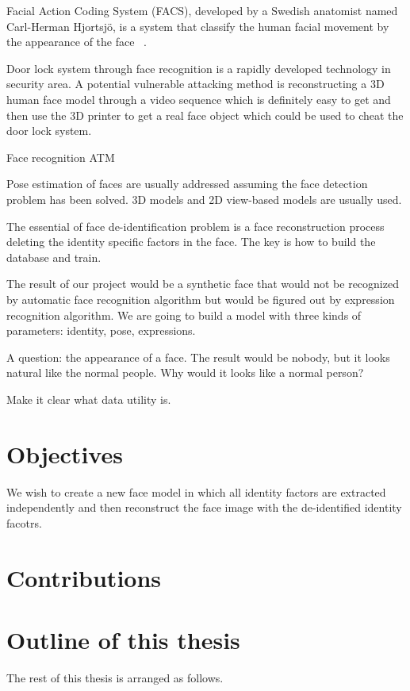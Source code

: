 Facial Action Coding System (FACS), developed by a Swedish anatomist named Carl-Herman Hjortsjö, is a system that classify the human facial movement by the appearance of the face ~\cite{facs70}. 


\par
Door lock system through face recognition is a rapidly developed technology in security area. A potential vulnerable attacking method is reconstructing a 3D human face model through a video sequence which is definitely easy to get and then use the 3D printer to get a real face object which could be used to cheat the door lock system. 

Face recognition ATM



Pose estimation of faces are usually addressed assuming the face detection problem has been solved. 3D models and 2D view-based models are usually used. 


The essential of face de-identification problem is a face reconstruction process deleting the identity specific factors in the face.  
The key is how to build the database and train. 

The result of our project would be a synthetic face that would not be recognized by automatic face recognition algorithm but would be figured out by expression recognition algorithm. We are going to build a model with three kinds of parameters: identity, pose, expressions. 

A question: the appearance of a face. The result would be nobody, but it looks natural like the normal people. Why would it looks like a normal person?

Make it clear what data utility is. 

\section{Objectives}
We wish to create a new face model in which all identity factors are extracted independently and then reconstruct the face image with the de-identified identity facotrs. 

\section{Contributions}
\par


\section{Outline of this thesis}
\par 
The rest of this thesis is arranged as follows. 